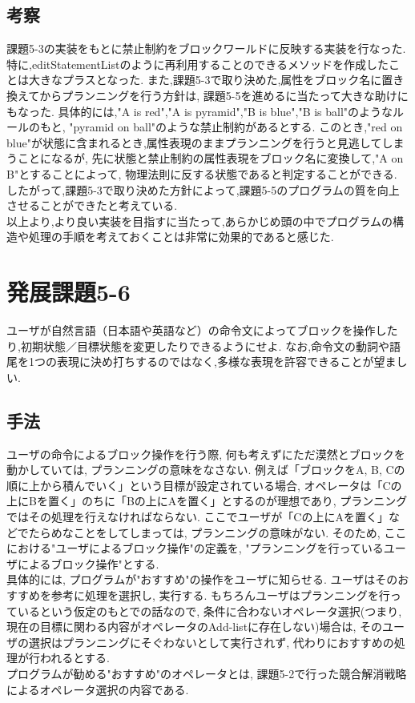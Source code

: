 \documentclass[uplatex,12pt]{jsarticle}
\begin{document}
\subsection{考察}
課題5-3の実装をもとに禁止制約をブロックワールドに反映する実装を行なった.
特に,editStatementListのように再利用することのできるメソッドを作成したことは大きなプラスとなった.
また,課題5-3で取り決めた,属性をブロック名に置き換えてからプランニングを行う方針は,
課題5-5を進めるに当たって大きな助けにもなった.
具体的には,"A is red","A is pyramid","B is blue","B is ball"のようなルールのもと,
"pyramid on ball"のような禁止制約があるとする.
このとき,"red on blue"が状態に含まれるとき,属性表現のままプランニングを行うと見逃してしまうことになるが,
先に状態と禁止制約の属性表現をブロック名に変換して,"A on B"とすることによって,
物理法則に反する状態であると判定することができる. \\
したがって,課題5-3で取り決めた方針によって,課題5-5のプログラムの質を向上させることができたと考えている. \\
以上より,より良い実装を目指すに当たって,あらかじめ頭の中でプログラムの構造や処理の手順を考えておくことは非常に効果的であると感じた.


\section{発展課題5-6}
\begin{screen}
    ユーザが自然言語（日本語や英語など）の命令文によってブロックを操作したり,初期状態／目標状態を変更したりできるようにせよ.
    なお,命令文の動詞や語尾を1つの表現に決め打ちするのではなく,多様な表現を許容できることが望ましい.
\end{screen}

\subsection{手法}
ユーザの命令によるブロック操作を行う際, 何も考えずにただ漠然とブロックを動かしていては, プランニングの意味をなさない. 例えば「ブロックをA, B, Cの順に上から積んでいく」という目標が設定されている場合, オペレータは「Cの上にBを置く」のちに「Bの上にAを置く」とするのが理想であり, プランニングではその処理を行えなければならない. ここでユーザが「Cの上にAを置く」などでたらめなことをしてしまっては, プランニングの意味がない. そのため, ここにおける"ユーザによるブロック操作"の定義を, "プランニングを行っているユーザによるブロック操作"とする. \\
具体的には, プログラムが"おすすめ"の操作をユーザに知らせる. ユーザはそのおすすめを参考に処理を選択し, 実行する. もちろんユーザはプランニングを行っているという仮定のもとでの話なので, 条件に合わないオペレータ選択(つまり, 現在の目標に関わる内容がオペレータのAdd-listに存在しない)場合は, そのユーザの選択はプランニングにそぐわないとして実行されず, 代わりにおすすめの処理が行われるとする.\\
プログラムが勧める"おすすめ"のオペレータとは, 課題5-2で行った競合解消戦略によるオペレータ選択の内容である.\\
\end{document}
